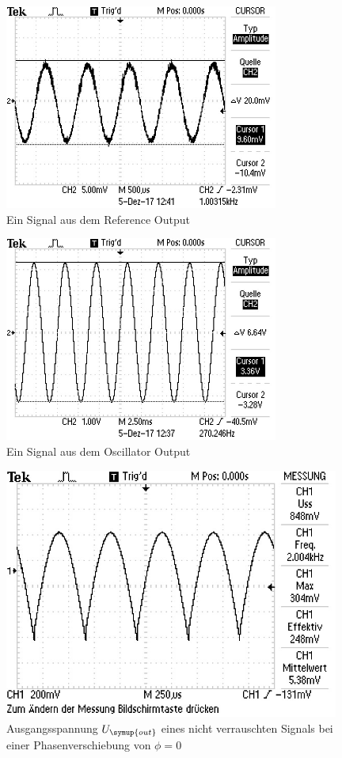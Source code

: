 \newpage
{}
\label{sec:Anhang}

\begin{figure}
  \centering
  \includegraphics[width=9cm]{data/reference_output.jpg}
  \caption{Ein Signal aus dem Reference Output}
  \label{fig:reference_output}
\end{figure}

\begin{figure}
  \centering
  \includegraphics[width=9cm]{data/oscillator_output.jpg}
  \caption{Ein Signal aus dem Oscillator Output}
  \label{fig:oscillator_output}
\end{figure}



\begin{figure}
  \centering
  \includegraphics[width=11cm]{data/phase_0.jpg}
  \caption{Ausgangsspannung $U_{\symup{out}}$ eines nicht verrauschten Signals bei einer Phasenverschiebung
  von $\phi=0$}
  \label{fig:phase_0}
\end{figure}

